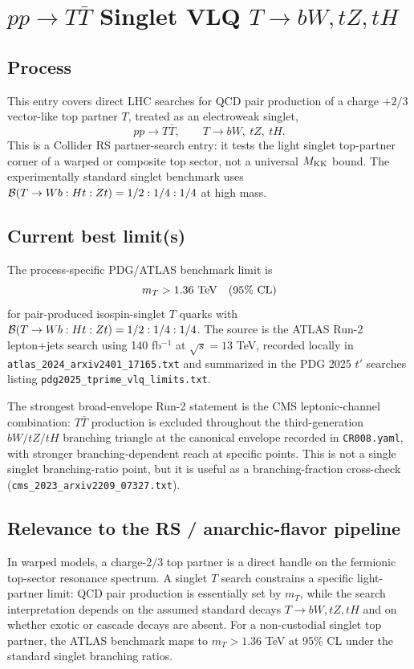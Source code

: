 
\section{\texorpdfstring{\(pp\to T\bar T\) Singlet VLQ \(T\to bW,tZ,tH\)}{pp to T Tbar singlet VLQ T to bW, tZ, tH}}

\subsection*{Process}
This entry covers direct LHC searches for QCD pair production of a charge
\(+2/3\) vector-like top partner \(T\), treated as an electroweak singlet,
\[
  pp\to T\bar T,\qquad T\to bW,\ tZ,\ tH .
\]
This is a Collider RS partner-search entry: it tests the light singlet
top-partner corner of a warped or composite top sector, not a universal
\(M_{\rm KK}\) bound.  The experimentally standard singlet benchmark uses
\({\cal B}(T\to Wb:Ht:Zt)=1/2:1/4:1/4\) at high mass.

\subsection*{Current best limit(s)}
The process-specific PDG/ATLAS benchmark limit is
\[
  m_T > 1.36~{\rm TeV}\quad (95\%~{\rm CL})
\]
for pair-produced isospin-singlet \(T\) quarks with
\({\cal B}(T\to Wb:Ht:Zt)=1/2:1/4:1/4\).  The source is the ATLAS Run-2
lepton+jets search using 140 fb\(^{-1}\) at \(\sqrt{s}=13\) TeV, recorded
locally in \texttt{atlas\_2024\_arxiv2401\_17165.txt} and summarized in the
PDG 2025 \(t'\) searches listing
\texttt{pdg2025\_tprime\_vlq\_limits.txt}.

The strongest broad-envelope Run-2 statement is the CMS leptonic-channel
combination: \(T\bar T\) production is excluded throughout the
third-generation \(bW/tZ/tH\) branching triangle at the canonical envelope
recorded in \texttt{CR008.yaml}, with stronger branching-dependent reach at
specific points.
This is not a single singlet branching-ratio point, but it is useful as a
branching-fraction cross-check
(\texttt{cms\_2023\_arxiv2209\_07327.txt}).

\subsection*{Relevance to the RS / anarchic-flavor pipeline}
In warped models, a charge-\(2/3\) top partner is a direct handle on the
fermionic top-sector resonance spectrum.  A singlet \(T\) search constrains a
specific light-partner limit: QCD pair production is essentially set by
\(m_T\), while the search interpretation depends on the assumed standard
decays \(T\to bW,tZ,tH\) and on whether exotic or cascade decays are absent.
For a non-custodial singlet top partner, the ATLAS benchmark maps to
\(m_T>1.36\) TeV at 95\% CL under the standard singlet branching ratios.

